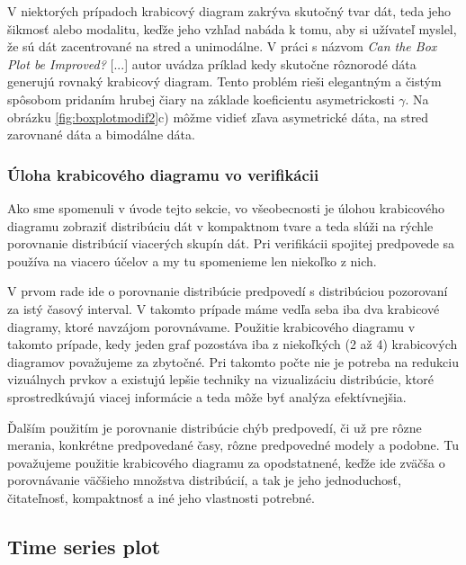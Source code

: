 V niektorých prípadoch krabicový diagram zakrýva skutočný tvar dát, teda jeho šikmosť alebo modalitu, keďže jeho vzhľad nabáda k tomu, aby si užívateľ myslel, že sú dát zacentrované na stred a unimodálne. V práci s názvom \textit{Can the Box Plot be Improved?} [...] autor uvádza príklad kedy skutočne rôznorodé dáta generujú rovnaký krabicový diagram. Tento problém rieši elegantným a čistým spôsobom pridaním hrubej čiary na základe koeficientu asymetrickosti $ \gamma $. Na obrázku \ref{fig:boxplotmodif2}c) môžme vidieť zľava asymetrické dáta, na stred zarovnané dáta a bimodálne dáta.

\subsubsection{Úloha krabicového diagramu vo verifikácii}

Ako sme spomenuli v úvode tejto sekcie, vo všeobecnosti je úlohou krabicového diagramu zobraziť distribúciu dát v kompaktnom tvare a teda slúži na rýchle porovnanie distribúcií viacerých skupín dát.
Pri verifikácii spojitej predpovede sa používa na viacero účelov a my tu spomenieme len niekoľko z nich. 

V prvom rade ide o porovnanie distribúcie predpovedí s distribúciou pozorovaní za istý časový interval. V takomto prípade máme vedľa seba iba dva krabicové diagramy, ktoré navzájom porovnávame. Použitie krabicového diagramu v takomto prípade, kedy jeden graf pozostáva iba z niekoľkých (2 až 4) krabicových diagramov považujeme za zbytočné. Pri takomto počte nie je potreba na redukciu vizuálnych prvkov a existujú lepšie techniky na vizualizáciu distribúcie, ktoré sprostredkúvajú viacej informácie a teda môže byť analýza efektívnejšia. 

Ďalším použitím je porovnanie distribúcie chýb predpovedí, či už pre rôzne merania, konkrétne predpovedané časy, rôzne predpovedné modely a podobne. Tu považujeme použitie krabicového diagramu za opodstatnené, keďže ide zväčša o porovnávanie väčšieho množstva distribúcií, a tak je jeho jednoduchosť, čitateľnosť, kompaktnosť a iné jeho vlastnosti potrebné.



\subsection{Time series plot}